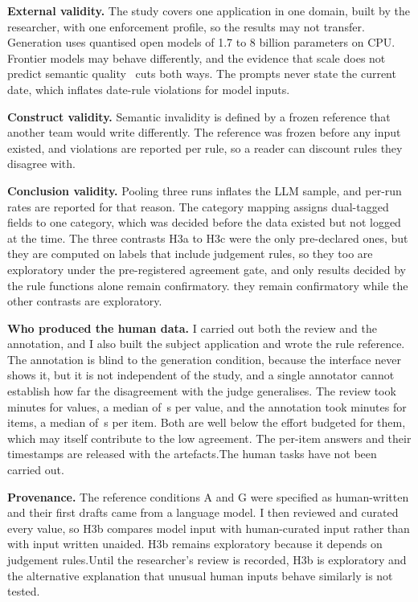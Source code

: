 \documentclass[conference]{IEEEtran}
\begin{document}
\textbf{External validity.} The study covers one application in one domain, built by the researcher,
with one enforcement profile, so the results may not transfer. Generation uses quantised open models of
1.7 to 8 billion parameters on CPU. Frontier models may behave differently, and the evidence that scale
does not predict semantic quality~\cite{singh2026sob,wrenn2026enterprise} cuts both ways. The prompts
never state the current date, which inflates date-rule violations for model inputs.

\textbf{Construct validity.} Semantic invalidity is defined by a frozen reference that another team
would write differently. The reference was frozen before any input existed, and violations are reported
per rule, so a reader can discount rules they disagree with.

\textbf{Conclusion validity.} Pooling three runs inflates the LLM sample, and per-run rates are
reported for that reason. The category mapping assigns dual-tagged fields to one category, which was
decided before the data existed but not logged at the time. The three contrasts H3a to H3c were the
only pre-declared ones, but they are computed on labels that include judgement rules,
so\ifjudgeweak{} they too are exploratory under the pre-registered agreement gate, and only results
decided by the rule functions alone remain confirmatory.\else{} they remain confirmatory while the
other contrasts are exploratory.\fi

\textbf{Who produced the human data.} \ifhumanlabels I carried out both the review and the annotation,
and I also built the subject application and wrote the rule reference. The annotation
is blind to the generation condition, because the interface never shows it, but it is not independent
of the study, and a single annotator cannot establish how far the disagreement with the judge
generalises. The review took  minutes for  values, a median of
\,s per value, and the annotation took  minutes for 
items, a median of \,s per item. Both are well below the effort budgeted for them,
which may itself contribute to the low agreement. The per-item answers and their timestamps are
released with the artefacts.\else The human tasks have not been carried out.\fi

\textbf{Provenance.} The reference conditions A and G were specified as human-written and their
first drafts came from a language model. \ifreviewed I then reviewed and curated every value, so H3b
compares model input with human-curated input rather than with input written unaided. H3b remains
exploratory because it depends on judgement rules.\else Until the researcher's review is recorded, H3b is
exploratory and the alternative explanation that unusual human inputs behave similarly is not
tested.\fi
\end{document}
